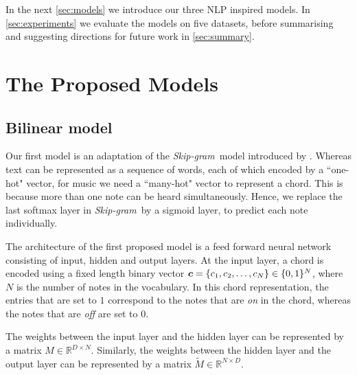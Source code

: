 \documentclass{article}
\newcommand{\R}{\mathbb{R}}
\newcommand{\M}{\tilde{M}}
\newcommand{\boldc}{\boldsymbol c}
\newcommand{\skipgram}{\textit{Skip-gram}}
\begin{document}
In the next \autoref{sec:models} we introduce our three NLP inspired models. In \autoref{sec:experiments} we evaluate the models on five datasets, before summarising and suggesting directions for future work in \autoref{sec:summary}. 

\section{The Proposed Models}
\label{sec:models}
\subsection{Bilinear model}
Our first model is an adaptation of the \skipgram\ model introduced by \citet{mik2013}. Whereas text can be represented as a sequence of words, each of which encoded by a ``one-hot" vector, for music we need a ``many-hot" vector to represent a chord. This is because more than one note can be heard simultaneously. Hence, we replace the last softmax layer in \skipgram\ by a sigmoid layer, to predict each note individually.  


The architecture of the first proposed model is a feed forward neural network consisting of input, hidden and output layers. At the input layer, a chord is encoded using a fixed length binary vector $\nolinebreak{\boldc = \{c_1, c_2, \ldots, c_N\}\in \{0,1\}^N}$, where $N$ is the number of notes in the vocabulary. In this chord representation, the entries that are set to $1$ correspond to the notes that are \textit{on} in the chord, whereas the notes that are \textit{off} are set to $0$. 

The weights between the input layer and the hidden layer can be represented by a matrix $M\in \R^{D \times N}$. Similarly, the weights between the hidden layer and the output layer can be represented by a matrix $\M\in \R^{N \times D}$. 
\end{document}
